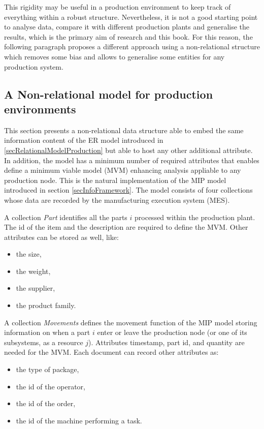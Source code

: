 This rigidity may be useful in a production environment to keep track of everything within a robust structure. Nevertheless, it is not a good starting point to analyse data, compare it with different production plants and generalise the results, which is the primary aim of research and this book. For this reason, the following paragraph proposes a different approach using a non-relational structure which removes some bias and allows to generalise some entities for any production system.

\subsection{A Non-relational model for production environments}

This section presents a non-relational data structure able to embed the same information content of the ER model introduced in \ref{secRelationalModelProduction} but able to host any other additional attribute.  In addition, the model has a minimum number of required attributes that enables define a minimum viable model (MVM) enhancing analysis appliable to any production node. This is the natural implementation of the MIP model introduced in section \ref{secInfoFramework}. The model consists of four collections whose data are recorded by the manufacturing execution system (MES). \par

A collection \textit{Part} identifies all the parts $i$ processed within the production plant. The id of the item and the description are required to define the MVM. Other attributes can be stored as well, like:

\begin{itemize}
    \item the size, 
    \item the weight, 
    \item the supplier,
    \item the product family.
\end{itemize}

A collection \textit{Movements} defines the movement function of the MIP model storing information on when a part $i$ enter or leave the production node (or one of its subsystems, as a resource $j$). Attributes timestamp, part id, and quantity are needed for the MVM. Each document can record other attributes as:

\begin{itemize}
    \item the type of package, 
    \item the id of the operator,
    \item the id of the order,
    \item the id of the machine performing a task.
\end{itemize}

